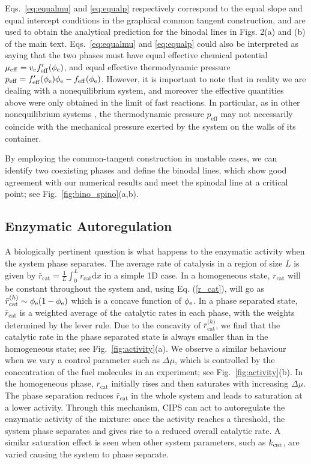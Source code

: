 Eqs.~\ref{eq:equalmu} and \ref{eq:equalp} respectively correspond to the equal slope and equal intercept conditions in the graphical common tangent construction, and are used to obtain the analytical prediction for the binodal lines in Figs. 2(a) and (b) of the main text. Eqs.~\ref{eq:equalmu} and \ref{eq:equalp} could also be interpreted as saying that the two phases must have equal effective chemical potential $\mu_\mathrm{eff} = v_{\mathrm{e}} f'_\mathrm{eff}(\phi_{\mathrm{e}})$, and equal effective thermodynamic pressure $p_\mathrm{eff}=f'_\mathrm{eff}(\phi_{\mathrm{e}})\phi_{\mathrm{e}} - f_\mathrm{eff}(\phi_{\mathrm{e}})$. However, it is important to note that in reality we are dealing with a nonequilibrium system, and moreover the effective quantities above were only obtained in the limit of fast reactions. In particular, as in other nonequilibrium systems \cite{wittkowski2014scalar}, the thermodynamic pressure $p_\mathrm{eff}$ may not necessarily coincide with the mechanical pressure exerted by the system on the walls of its container.

By employing the common-tangent construction in unstable cases, we can identify two coexisting phases and define the binodal lines, which show good agreement with our numerical results and meet the spinodal line at a critical point; see Fig.~\ref{fig:bino_spino}(a,b).



\subsection{Enzymatic Autoregulation}

A biologically pertinent question is what happens to the enzymatic activity when the system phase separates. The average rate of catalysis in a region of size $L$ is given by $\bar{r}_\mathrm{cat} = \frac{1}{L}\int_0^L r_\mathrm{cat} \mathrm{d}x$ in a simple 1D case. In a homogeneous state, $r_\mathrm{cat}$ will be constant throughout the system and, using Eq. (\ref{r_cat}), will go as $\bar{r}_\mathrm{cat}^{\mathrm(h)}\sim\phi_{\mathrm{e}}(1-\phi_{\mathrm{e}})$ which is a concave function of $\phi_{\mathrm{e}}$. In a phase separated state, $\bar{r}_\mathrm{cat}$ is a weighted average of the catalytic rates in each phase, with the weights determined by the lever rule. Due to the concavity of $\bar{r}_\mathrm{cat}^{\mathrm(h)}$, we find that the catalytic rate in the phase separated state is always smaller than in the homogeneous state; see Fig.~\ref{fig:activity}(a). We observe a similar behaviour when we vary a control parameter such as $\Delta\mu$, which is controlled by the concentration of the fuel molecules in an experiment; see Fig.~\ref{fig:activity}(b). In the homogeneous phase, $\bar{r}_\mathrm{cat}$ initially rises and then saturates with increasing $\Delta\mu$. The phase separation reduces $\bar{r}_\mathrm{cat}$ in the whole system and leads to saturation at a lower activity. Through this mechanism, CIPS can act to autoregulate the enzymatic activity of the mixture: once the activity reaches a threshold, the system phase separates and gives rise to a reduced overall catalytic rate. A similar saturation effect is seen when other system parameters, such as $k_{\mathrm{cat}}$, are varied causing the system to phase separate.

